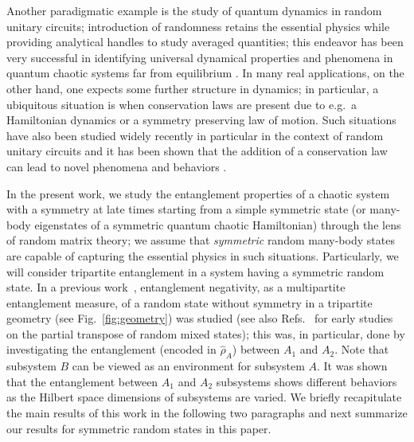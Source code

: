 \documentclass[aps,pra,reprint,superscriptaddress,twocolumn,notitlepage]{revtex4-1}
\numberwithin{equation}{section}
\begin{document}
Another paradigmatic example is the study of quantum dynamics in random unitary circuits; introduction of randomness retains the essential physics while providing analytical handles to study averaged quantities; this endeavor has been very successful in identifying universal dynamical properties and phenomena in quantum chaotic systems far from equilibrium \cite{nahum2017quantum,nahum2018operator,von2018operator,chan2018solution}. 
In many real applications, on the other hand, one expects some further structure in dynamics; in particular, a ubiquitous situation is when conservation laws are present due to e.g.~a Hamiltonian dynamics or a symmetry preserving law of motion. Such situations have also been studied widely recently in particular in the context of random unitary circuits and it has been shown that the addition of a conservation law can lead to novel phenomena and behaviors \cite{rakovszky2018diffusive,khemani2018operator}. 

In the present work, we study the entanglement properties of a chaotic system with a symmetry at late times starting from a simple symmetric state (or many-body eigenstates of a symmetric quantum chaotic Hamiltonian) through the lens of random matrix theory; we assume that {\it symmetric} random many-body states are capable of capturing the essential physics in such situations. Particularly, we will consider tripartite entanglement in a system having a symmetric random state.
In a previous work~\cite{Shapourian2021}, entanglement negativity, as a multipartite entanglement measure, of a random state without symmetry in a tripartite geometry (see Fig.~\ref{fig:geometry}) was studied (see also Refs.~\cite{Marko2007,Aubrun2010,Aubrun2014,Bhosale,Aubrun2012,Fukuda2013,Collins2012,Szyma_ski_2017,Collins_rev,Gray2018} for early studies on the partial transpose of random mixed states); this was, in particular, done by investigating the entanglement (encoded in $\hat\rho_A$) between $A_1$ and $A_2$. Note that subsystem $B$ can be viewed as an environment for subsystem $A$. It was shown that the entanglement between $A_1$ and $A_2$ subsystems shows different behaviors as the Hilbert space dimensions of subsystems are varied.
We briefly recapitulate the main results of this work in the following two paragraphs and next summarize our results for symmetric random states in this paper. 
\end{document}
